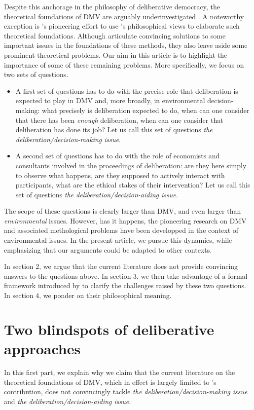 \documentclass[version=3.21, pagesize, twoside=off, bibliography=totoc, DIV=calc, fontsize=12pt, a4paper, french, english]{scrartcl}
\begin{document}
Despite this anchorage in the philosophy of deliberative democracy, the theoretical foundations of DMV are arguably underinvestigated \citep{bartkowski_economic_2017,bartkowski_beyond_2018,bunse_what_2015,kenter_what_2015}. 
A noteworthy exception is \citet{bartkowski_beyond_2018}'s pioneering effort to use \citet{sen_idea_2009}'s philosophical views to elaborate such theoretical foundations. 
Although \citet{bartkowski_beyond_2018} articulate convincing solutions to some important issues in the foundations of these methods, they also leave aside some prominent theoretical problems. 
Our aim in this article is to highlight the importance of some of these remaining problems. 
More specifically, we focus on two sets of questions.
\begin{itemize}
\item A first set of questions has to do with the precise role that deliberation is expected to play in DMV and, more broadly, in environmental decision-making: what precisely is deliberation expected to do, when can one consider that there has been \emph{enough} deliberation, when can one consider that deliberation has done its job?
Let us call this set of questions \emph{the deliberation/decision-making issue}.
\item A second set of questions has to do with the role of economists and consultants involved in the proceedings of deliberation: are they here simply to observe what happens, are they supposed to actively interact with participants, what are the ethical stakes of their intervention? 
Let us call this set of questions \emph{the deliberation/decision-aiding issue}.
\end{itemize}
The scope of these questions is clearly larger than DMV, and even larger than \emph{environmental} issues. 
However, has it happens, the pioneering research on DMV and associated methological problems have been developped in the context of environmental issues. 
In the present article, we pursue this dynamics, while emphasizing that our arguments could be adapted to other contexts.

In section 2, we argue that the current literature does not provide convincing answers to the questions above. 
In section 3, we then take advantage of a formal framework introduced by \citet{cailloux_formal_2018} to clarify the challenges raised by these two questions.
In section 4, we ponder on their philosophical meaning.

\section{Two blindspots of deliberative approaches}
In this first part, we explain why we claim that the current literature on the theoretical foundations of DMV, which in effect is largely limited to \citet{bartkowski_beyond_2018}'s contribution, does not convincingly tackle \emph{the deliberation/decision-making issue} and \emph{the deliberation/decision-aiding issue}.
\end{document}
